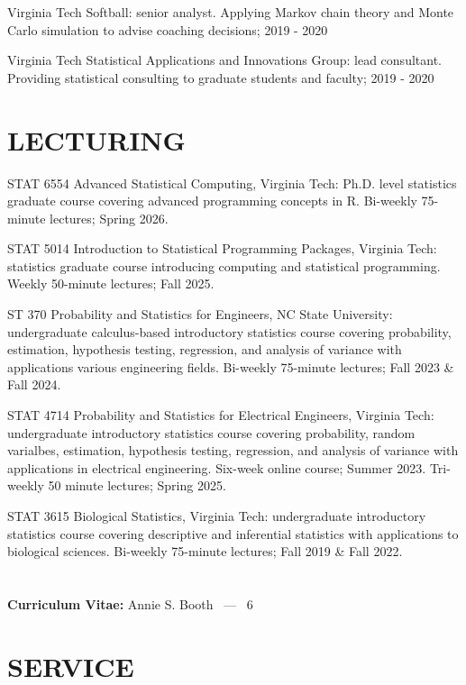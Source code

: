 \documentclass[margin,line,11pt]{res}
\begin{document}
\begin{resume}
{\sc Virginia Tech Softball}: senior analyst.  Applying Markov chain theory and Monte Carlo simulation to advise coaching decisions; 2019 - 2020

{\sc Virginia Tech Statistical Applications and Innovations Group}: lead consultant.  Providing statistical consulting to graduate students and faculty; 2019 - 2020

\medskip
\section{LECTURING}

{\sc STAT 6554 Advanced Statistical Computing, Virginia Tech}: Ph.D. level statistics graduate course covering
advanced programming concepts in R.  Bi-weekly 75-minute lectures; Spring 2026.

{\sc STAT 5014 Introduction to Statistical Programming Packages, Virginia Tech}: statistics graduate course introducing computing and statistical programming.  Weekly 50-minute lectures; Fall 2025.

{\sc ST 370 Probability and Statistics for Engineers, NC State University}: undergraduate calculus-based introductory statistics course covering probability, estimation, hypothesis testing, regression, and analysis of variance with applications various engineering fields. Bi-weekly 75-minute lectures; Fall 2023 \& Fall 2024.

{\sc STAT 4714 Probability and Statistics for Electrical Engineers, Virginia Tech}: undergraduate introductory statistics course covering probability, random varialbes, estimation, hypothesis testing, regression, and analysis of variance with applications in electrical engineering. Six-week online course; Summer 2023. Tri-weekly 50 minute lectures; Spring 2025.

{\sc STAT 3615 Biological Statistics, Virginia Tech}: undergraduate introductory statistics course covering descriptive and inferential statistics with applications to biological sciences. Bi-weekly 75-minute lectures; Fall 2019 \& Fall 2022.


\pagebreak
\section{}
\hfill {\bf Curriculum Vitae:} Annie S. Booth \  --- \  6
\medskip

\section{\bf SERVICE}


\end{resume}
\end{document}
